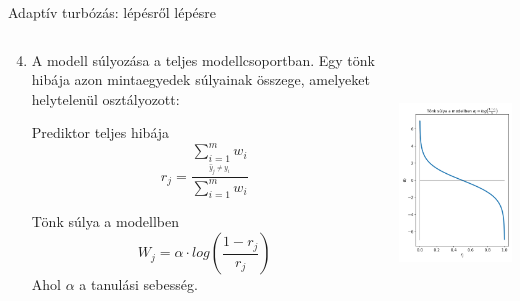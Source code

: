 \documentclass[english, aspectratio=169]{beamer}
\begin{document}
\begin{frame}{Adaptív turbózás: lépésről lépésre}
\begin{columns}
\begin{column}{.5\textwidth}
\begin{enumerate}
	\setcounter{enumi}{3}
	\item A modell súlyozása a teljes modellcsoportban. Egy tönk hibája azon mintaegyedek súlyainak összege, amelyeket helytelenül osztályozott:
	\begin{block}{Prediktor teljes hibája}
	\[
	r_j = \frac{\sum_{\underset{\hat{y}_j \neq y_i}{i=1}}^m w_i}{\sum_{i=1}^m w_i}
	\]
	\end{block}
	\begin{block}{Tönk súlya a modellben}
	\[
	W_j = \alpha \cdot log \left( \frac{1-r_j}{r_j} \right)
	\]
	Ahol $\alpha$ a tanulási sebesség.
	\end{block}
\end{enumerate}
\end{column}
\begin{column}{.5\textwidth}
\begin{center}
\includegraphics[width=7cm, height=7cm, keepaspectratio]{images/ensemble_6.png}
\end{center}
\end{column}
\end{columns}
\end{frame}
\end{document}
